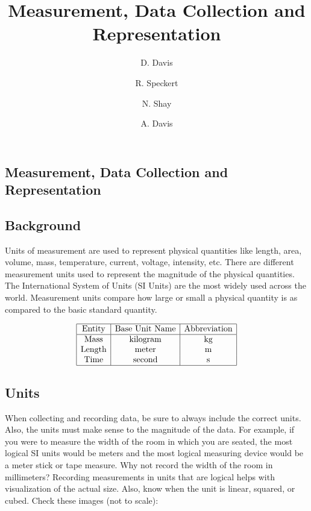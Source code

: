 \documentclass{ximera}
\author{D. Davis \and R. Speckert \and N. Shay \and A. Davis}
\title{Measurement, Data Collection and Representation} \license{CC BY-NC-SA 4.0}
\begin{document}
\begin{abstract}
\end{abstract}
\maketitle

\begin{onlineOnly}
\section*{Measurement, Data Collection and Representation}
\end{onlineOnly}
\subsection*{Background}
Units of measurement are used to represent physical quantities like length, area, volume, mass, temperature, current, voltage, intensity, etc.  There are different measurement units used to represent the magnitude of the physical quantities. The International System of Units (SI Units) are the most widely used across the world. Measurement units compare how large or small a physical quantity is as compared to the basic standard quantity.  

$$\begin{array}{|c|c|c|} 
 \hline \text{Entity}&\text{Base Unit Name}&\text{Abbreviation}\\ \hline \text{Mass}&\text{kilogram}&\text{kg}\\  \text{Length}&\text{meter}&\text{m}\\
 \text{Time} &\text{second}&\text{s}\\
  \hline 
 \end{array}$$

\subsection*{Units}
When collecting and recording data, be sure to always include the correct units.  Also, the units must make sense to the magnitude of the data.  For example, if you were to measure the width of the room in which you are seated, the most logical SI units would be meters and the most logical measuring device would be a meter stick or tape measure.  
Why not record the width of the room in millimeters?  
Recording measurements in units that are logical helps with visualization of the actual size.  
Also, know when the unit is linear, squared, or cubed.   Check these images (not to scale):
\end{document}
